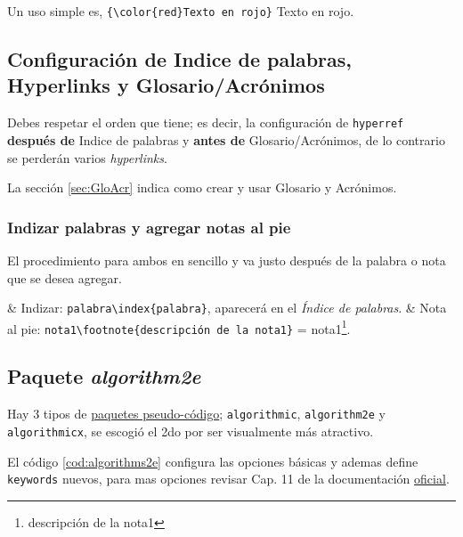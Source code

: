 Un uso simple es, \verb|{\color{red}Texto en rojo}| {\textrightarrow} {\color{red}Texto en rojo}.

\subsection{Configuración de Indice de palabras, Hyperlinks y Glosario/Acrónimos}
Debes respetar el orden que tiene; es decir, la configuración de \verb|hyperref| \textbf{después de} Indice de palabras y \textbf{antes de} Glosario/Acrónimos, de lo contrario se perderán varios \textit{hyperlinks}.


La sección \ref{sec:GloAcr} indica como crear y usar Glosario y Acrónimos.

\subsubsection{Indizar palabras y agregar notas al pie}
El procedimiento para ambos en sencillo y va justo después de la palabra o nota que se desea agregar.

\Activate
\begin{easylist}[itemize]	
	& Indizar: \verb|palabra\index{palabra}|,  aparecerá en el \textit{Índice de palabras}.
	& Nota al pie:  \verb|nota1\footnote{descripción de la nota1}| = nota1\footnote{descripción de la nota1}.	
\end{easylist}
\Deactivate

\subsection{Paquete \textit{algorithm2e}}
Hay 3 tipos de \href{http://en.wikibooks.org/wiki/LaTeX/Algorithms}{paquetes pseudo-código}; \verb|algorithmic|, \verb|algorithm2e| y \verb|algorithmicx|, se escogió el 2do por ser visualmente más atractivo.

El código \ref{cod:algorithms2e} configura las opciones básicas y ademas define \verb|keywords| nuevos, para mas opciones revisar Cap. 11 de la documentación \href{http://ctan.mirrors.hoobly.com/macros/latex/contrib/algorithm2e/doc/algorithm2e.pdf}{oficial}.



